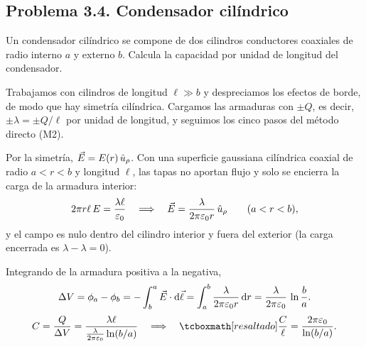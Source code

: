 \subsection{Problema 3.4. Condensador cilíndrico}\label{sem:cilindrico}
\begin{problema}\label{prob:cilindrico}
Un condensador cilíndrico se compone de dos cilindros conductores coaxiales de radio interno $a$ y externo $b$. Calcula la capacidad por unidad de longitud
del condensador.
\end{problema}

\begin{resolucion}
 Trabajamos con cilindros de longitud $\ell\gg b$ y despreciamos los efectos de borde, de modo que hay simetría cilíndrica. Cargamos las
armaduras con $\pm Q$, es decir, $\pm\lambda=\pm Q/\ell$ por unidad de longitud, y seguimos los cinco pasos del método directo (M2).

 Por la simetría, $\vec{E}=E(r)\,\hat{u}_{\rho}$. Con una superficie gaussiana cilíndrica coaxial de radio $a<r<b$ y longitud $\ell$, las
tapas no aportan flujo y solo se encierra la carga de la armadura interior:
\[
  2\pi r\ell\,E=\frac{\lambda\ell}{\varepsilon_{0}}\quad\Longrightarrow\quad\vec{E}=\frac{\lambda}{2\pi\varepsilon_{0} r}\,\hat{u}_{\rho}\qquad(a<r<b),
\]
y el campo es nulo dentro del cilindro interior y fuera del exterior (la carga encerrada es $\lambda-\lambda=0$).

 Integrando de la armadura positiva a la negativa,
\[
  \Delta V=\phi_a-\phi_b=-\int_{b}^{a}\vec{E}\cdot\mathrm{d}\vec{\ell}=\int_{a}^{b}\frac{\lambda}{2\pi\varepsilon_{0} r}\,\mathrm{d} r=\frac{\lambda}{2\pi\varepsilon_{0}}\,\ln\frac{b}{a}.
\]
\[
  C=\frac{Q}{\DV}=\frac{\lambda\ell}{\frac{\lambda}{2\pi\eo}\ln(b/a)}\quad\Longrightarrow\quad\resalta{\frac{C}{\ell}=\frac{2\pi\eo}{\ln(b/a)} .}
\]


\end{resolucion}
